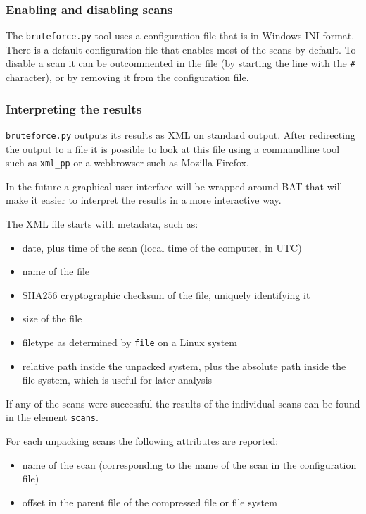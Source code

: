 \documentclass[10pt]{article}
\begin{document}
\subsubsection{Enabling and disabling scans}

The \texttt{bruteforce.py} tool uses a configuration file that is in Windows
INI format. There is a default configuration file that enables most of the
scans by default. To disable a scan it can be outcommented in the file (by
starting the line with the \texttt{\#} character), or by removing it from the
configuration file.

\subsubsection{Interpreting the results}

\texttt{bruteforce.py} outputs its results as XML on standard output. After
redirecting the output to a file it is possible to look at this file using a
commandline tool such as \texttt{xml\_pp} or a webbrowser such as Mozilla
Firefox.

In the future a graphical user interface will be wrapped around BAT that will
make it easier to interpret the results in a more interactive way.

The XML file starts with metadata, such as:

\begin{itemize}
\item date, plus time of the scan (local time of the computer, in UTC)
\item name of the file
\item SHA256 cryptographic checksum of the file, uniquely identifying it
\item size of the file
\item filetype as determined by \texttt{file} on a Linux system
\item relative path inside the unpacked system, plus the absolute path inside
the file system, which is useful for later analysis
\end{itemize}

If any of the scans were successful the results of the individual scans can
be found in the element \texttt{scans}.

For each unpacking scans the following attributes are reported:

\begin{itemize}
\item name of the scan (corresponding to the name of the scan in the
configuration file)
\item offset in the parent file of the compressed file or file system
\end{itemize}
\end{document}
